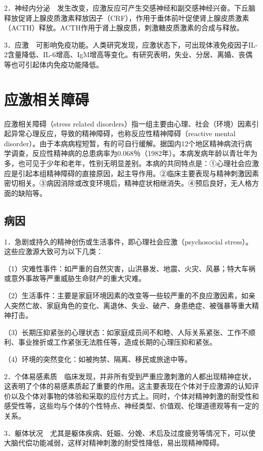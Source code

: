 2．神经内分泌　发生改变，应激反应可产生交感神经和副交感神经兴奋。下丘脑释放促肾上腺皮质激素释放因子（CRF），作用于垂体前叶促使肾上腺皮质激素（ACTH）释放。ACTH作用于肾上腺皮质，刺激糖皮质激素的合成与释放。

3．应激　可影响免疫功能。人类研究发现，应激状态下，可出现体液免疫因子IL-2含量降低、IL-6增高、IgM增高等变化。有研究表明，失业、分居、离婚、丧偶等也可引起体内免疫功能降低。

\section{应激相关障碍}

应激相关障碍（stress related
disorders）指一组主要由心理、社会（环境）因素引起异常心理反应，导致的精神障碍，也称反应性精神障碍（reactive
mental
disorder）。由于本病病程短暂，有的可自行缓解。据国内12个地区精神病流行病学调查，反应性精神病的总患病率为0.068％（1982年）。本病发病年龄以青壮年为多，也可见于少年和老年，性别无明显差别。本病的共同特点是：①心理社会应激应是引起本组精神障碍的直接原因，起主导作用。②临床主要表现与精神刺激因素密切相关。③病因消除或改变环境后，精神症状相继消失。④预后良好，无人格方面的缺陷等。

\subsection{病因}

1．急剧或持久的精神创伤或生活事件，即心理社会应激（psychosocial
stress）。这些应激源大致可为以下几类：

（1）灾难性事件：如严重的自然灾害，山洪暴发、地震、火灾、风暴；特大车祸或意外事故等严重威胁生命财产的重大灾难。

（2）生活事件：主要是家庭环境因素的改变等一些较严重的不良应激因素，如亲人突然亡故、家庭角色的变化、离退休、失业、破产、身患绝症、被强暴等重大精神打击。

（3）长期压抑紧张的心理状态：如家庭成员间不和睦、人际关系紧张、工作不顺利、事业挫折或工作紧张无法胜任等，造成长期的心理压抑和紧张。

（4）环境的突然变化：如被拘禁、隔离、移民或旅途中等。

2．个体易感素质　临床发现，并非所有受到严重应激刺激的人都出现精神症状，这表明了个体的易感素质起了重要的作用。这主要表现在个体对于应激源的认知评价以及个体对事物的体验和采取的应付方式上。同时，个体对精神刺激的耐受性和感受性等，这些均与个体的个性特点、神经类型、价值观、伦理道德观等有一定的关系。

3．躯体状况　尤其是躯体疾病、妊娠、分娩、术后及过度疲劳等情况下，可以使大脑代偿功能减弱，这样对精神刺激的耐受性降低，易出现精神障碍。

